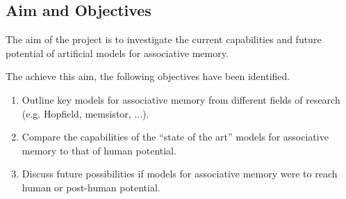 \subsection{Aim and Objectives}

The aim of the project is to investigate the current capabilities and future potential of artificial models for associative memory.

The achieve this aim, the following objectives have been identified.

\begin{enumerate}
	\item Outline key models for associative memory from different fields of research (e.g. Hopfield, memsistor, ...).
	\item Compare the capabilities of the ``state of the art'' models for associative memory to that of human potential.
	\item Discuss future possibilities if models for associative memory were to reach human or post-human potential.
\end{enumerate}
